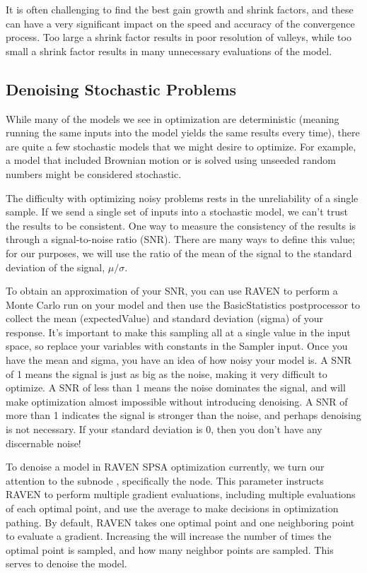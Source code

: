 It is often challenging to find the best gain growth and shrink factors, and these can have a very significant
impact on the speed and accuracy of the convergence process.  Too large a shrink factor results in poor
resolution of valleys, while too small a shrink factor results in many unnecessary evaluations of the model.

\subsection{Denoising Stochastic Problems}
While many of the models we see in optimization are deterministic (meaning running the same inputs into the
model yields the same results every time), there are quite a few stochastic models that we might desire to
optimize.  For example, a model that included Brownian motion or is solved using unseeded random numbers might
be considered stochastic.

The difficulty with optimizing noisy problems rests in the unreliability of a single sample.  If we send a
single set of inputs into a stochastic model, we can't trust the results to be consistent.  One way to measure
the consistency of the results is through a signal-to-noise ratio (SNR).  There are many ways to define this
value; for our purposes, we will use the ratio of the mean of the signal to the standard deviation of the
signal, $\mu/\sigma$.

To obtain an approximation of your SNR, you can use RAVEN to perform a Monte Carlo run on your model and then
use the BasicStatistics postprocessor to collect the mean (expectedValue) and standard deviation (sigma) of
your response.  It's important to make this sampling all at a single value in the input space, so replace your
variables with constants in the Sampler input.  Once you have the mean and sigma, you have an idea of how
noisy your model is.  A SNR of 1 means the signal is just as big as the noise, making it very difficult to
optimize.  A SNR of less than 1 means the noise dominates the signal, and will make optimization almost
impossible without introducing denoising.  A SNR of more than 1 indicates the signal is stronger than the
noise, and perhaps denoising is not necessary.  If your standard deviation is 0, then you don't have any
discernable noise!

To denoise a model in RAVEN SPSA optimization currently, we turn our attention to the 
subnode , specifically the  node.  This parameter instructs
RAVEN to perform multiple gradient evaluations, including multiple evaluations of each optimal point, and use
the average to make decisions in optimization pathing.  By default, RAVEN takes one optimal point and one
neighboring point to evaluate a gradient.  Increasing the  will increase the
number of times the optimal point is sampled, and how many neighbor points are sampled.  This serves to
denoise the model.

